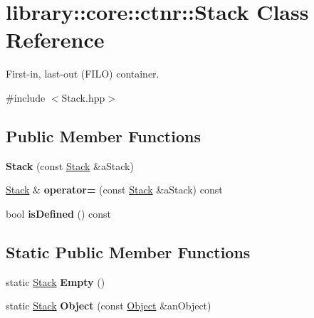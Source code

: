 \hypertarget{classlibrary_1_1core_1_1ctnr_1_1_stack}{}\section{library\+:\+:core\+:\+:ctnr\+:\+:Stack Class Reference}
\label{classlibrary_1_1core_1_1ctnr_1_1_stack}


First-\/in, last-\/out (F\+I\+LO) container.  




{\ttfamily \#include $<$Stack.\+hpp$>$}

\subsection*{Public Member Functions}
\begin{DoxyCompactItemize}
\item 
\mbox{\label{classlibrary_1_1core_1_1ctnr_1_1_stack_afc0d9eef5ab84c7a70fc48244bd37dd9}} 
{\bfseries Stack} (const \hyperlink{classlibrary_1_1core_1_1ctnr_1_1_stack}{Stack} \&a\+Stack)
\item 
\mbox{\label{classlibrary_1_1core_1_1ctnr_1_1_stack_a47582de8d7cf737758001a298b53b15a}} 
\hyperlink{classlibrary_1_1core_1_1ctnr_1_1_stack}{Stack} \& {\bfseries operator=} (const \hyperlink{classlibrary_1_1core_1_1ctnr_1_1_stack}{Stack} \&a\+Stack) const
\item 
\mbox{\label{classlibrary_1_1core_1_1ctnr_1_1_stack_ad2a8aa517bec8186be053fed685293be}} 
bool {\bfseries is\+Defined} () const
\end{DoxyCompactItemize}
\subsection*{Static Public Member Functions}
\begin{DoxyCompactItemize}
\item 
\mbox{\label{classlibrary_1_1core_1_1ctnr_1_1_stack_a1690111fddf67ad714452f7d0274dae5}} 
static \hyperlink{classlibrary_1_1core_1_1ctnr_1_1_stack}{Stack} {\bfseries Empty} ()
\item 
\mbox{\label{classlibrary_1_1core_1_1ctnr_1_1_stack_a640c6f06b4f7be94343330458503b6fb}} 
static \hyperlink{classlibrary_1_1core_1_1ctnr_1_1_stack}{Stack} {\bfseries Object} (const \hyperlink{classlibrary_1_1core_1_1ctnr_1_1_object}{Object} \&an\+Object)
\end{DoxyCompactItemize}
